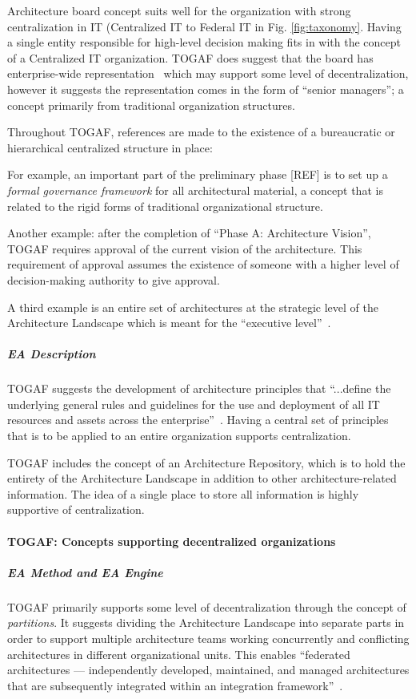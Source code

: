 
Architecture board concept suits well for the organization with strong centralization in IT (Centralized IT to Federal IT in Fig. \ref{fig:taxonomy}.  Having a single entity responsible for high-level decision making fits in with the concept of a Centralized IT organization. TOGAF does suggest that the board has enterprise-wide representation~\cite[Ch. 47]{togaf9.1} which may support some level of decentralization, however it suggests the representation comes in the form of ``senior managers''; a concept primarily from traditional organization structures. 

Throughout TOGAF, references are made to the existence of a bureaucratic or hierarchical centralized structure in place: 

For example, an important part of the preliminary phase [REF] is to set up a \textit{formal governance framework} for all architectural material, a concept that is related to the rigid forms of traditional organizational structure. 

Another example: after the completion of ``Phase A: Architecture Vision'', TOGAF requires approval of the current vision of the architecture. This requirement of approval assumes the existence of someone with a higher level of decision-making authority to give approval. 

A third example is an entire set of architectures at the strategic level of the Architecture Landscape which is meant for the ``executive level''~\cite[Ch. 20]{togaf9.1}.

\subparagraph*{EA Description}
TOGAF suggests the development of architecture principles that ``...define the underlying general rules and guidelines for the use and deployment of all IT resources and assets across the enterprise''~\cite[Ch. 23]{togaf9.1}. Having a central set of principles that is to be applied to an entire organization supports centralization.

TOGAF includes the concept of an Architecture Repository, which is to hold the entirety of the Architecture Landscape in addition to other architecture-related information. The idea of a single place to store all information is highly supportive of centralization. 

\paragraph*{TOGAF: Concepts supporting decentralized organizations}
\subparagraph*{EA Method and EA Engine}
TOGAF primarily supports some level of decentralization through the concept of \textit{partitions}. It suggests dividing the Architecture Landscape into separate parts in order to support multiple architecture teams working concurrently and conflicting architectures in different organizational units. This enables ``federated architectures — independently developed, maintained, and managed architectures that are subsequently integrated within an integration framework''~\cite[Ch. 40.3]{togaf9.1}. 


